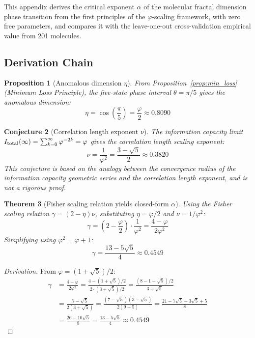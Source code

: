 \documentclass[12pt,a4paper,twocolumn]{article}
\renewcommand{\phi}{\varphi}
\newtheorem{theorem}{Theorem}[section]
\newtheorem{proposition}[theorem]{Proposition}
\newtheorem{conjecture}[theorem]{Conjecture}
\begin{document}
This appendix derives the critical exponent $\alpha$ of the molecular fractal dimension phase transition from the first principles of the $\phi$-scaling framework, with zero free parameters, and compares it with the leave-one-out cross-validation empirical value from 201 molecules.

\subsection{Derivation Chain}
\label{subsec:alpha_derivation_en}

\begin{proposition}[Anomalous dimension $\eta$]
\label{prop:eta_en}
From Proposition~\ref{prop:min_loss} (Minimum Loss Principle), the five-state phase interval $\theta = \pi/5$ gives the anomalous dimension:
\begin{equation}
\eta = \cos\left(\frac{\pi}{5}\right) = \frac{\phi}{2} \approx 0.8090
\end{equation}
\end{proposition}

\begin{conjecture}[Correlation length exponent $\nu$]
\label{conj:nu_en}
The information capacity limit $I_{\rm total}(\infty) = \sum_{k=0}^{\infty}\phi^{-2k} = \phi$ gives the correlation length scaling exponent:
\begin{equation}
\nu = \frac{1}{\phi^2} = \frac{3-\sqrt{5}}{2} \approx 0.3820
\end{equation}
This conjecture is based on the analogy between the convergence radius of the information capacity geometric series and the correlation length exponent, and is not a rigorous proof.
\end{conjecture}

\begin{theorem}[Fisher scaling relation yields closed-form $\alpha$]
\label{thm:alpha_en}
Using the Fisher scaling relation $\gamma = (2-\eta)\nu$, substituting $\eta = \phi/2$ and $\nu = 1/\phi^2$:
\begin{equation}
\gamma = \left(2 - \frac{\phi}{2}\right) \cdot \frac{1}{\phi^2} = \frac{4 - \phi}{2\phi^2}
\end{equation}
Simplifying using $\phi^2 = \phi + 1$:
\begin{equation}
\boxed{\gamma = \frac{13 - 5\sqrt{5}}{4} \approx 0.4549}
\end{equation}
\end{theorem}

\begin{proof}[Derivation]
From $\phi = (1+\sqrt{5})/2$:
\begin{align}
\gamma &= \frac{4 - \phi}{2\phi^2} = \frac{4 - (1+\sqrt{5})/2}{2 \cdot (3+\sqrt{5})/2} = \frac{(8 - 1 - \sqrt{5})/2}{3 + \sqrt{5}} \\
&= \frac{7 - \sqrt{5}}{2(3 + \sqrt{5})} = \frac{(7 - \sqrt{5})(3 - \sqrt{5})}{2(9 - 5)} = \frac{21 - 7\sqrt{5} - 3\sqrt{5} + 5}{8} \\
&= \frac{26 - 10\sqrt{5}}{8} = \frac{13 - 5\sqrt{5}}{4} \approx 0.4549
\end{align}
\end{proof}
\end{document}
